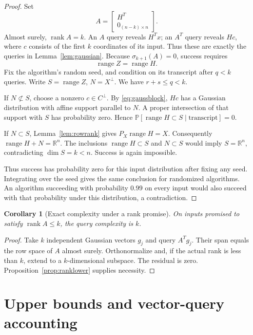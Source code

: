 \documentclass[11pt]{article}
\numberwithin{equation}{section}
\newtheorem{corollary}[theorem]{Corollary}
\theoremstyle{definition}
\newcommand{\R}{\mathbb R}
\newcommand{\Prb}{\mathbb P}
\newcommand{\rank}{\operatorname{rank}}
\newcommand{\range}{\operatorname{range}}
\begin{document}
\begin{proof}
Set
\begin{equation}
 A=\begin{bmatrix}H^T\\0_{(n-k)\times n}\end{bmatrix}.
 \label{eq:rankfamily}
\end{equation}
Almost surely, $\rank A=k$. An $A$ query reveals $H^Tx$; an $A^T$ query
reveals $Hc$, where $c$ consists of the first $k$ coordinates of its input.
Thus these are exactly the queries in Lemma~\ref{lem:gaussian}.
Because $\sigma_{k+1}(A)=0$, success requires
\[
 \range Z=\range H.
\]
Fix the algorithm's random seed, and condition on its transcript after
$q<k$ queries. Write $S=\range Z$, $N=X^\perp$. We have $r+s\le q<k$.

If $N\not\subset S$, choose a nonzero $c\in C^\perp$. By
\eqref{eq:gaussblock}, $Hc$ has a Gaussian distribution with affine support
parallel to $N$. A proper intersection of that support with $S$ has
probability zero. Hence $\Prb[\range H\subset S\mid\text{transcript}]=0$.

If $N\subset S$, Lemma~\ref{lem:rowrank} gives
$P_X\range H=X$. Consequently $\range H+N=\R^n$.
The inclusions $\range H\subset S$ and $N\subset S$ would imply
$S=\R^n$, contradicting $\dim S=k<n$. Success is again impossible.

Thus success has probability zero for this input distribution after fixing
any seed. Integrating over the seed gives the same conclusion for randomized
algorithms. An algorithm succeeding with probability $0.99$ on every input
would also succeed with that probability under this distribution, a
contradiction.
\end{proof}

\begin{corollary}[Exact complexity under a rank promise]
\label{cor:promise}
On inputs promised to satisfy $\rank A\le k$, the query complexity is $k$.
\end{corollary}
\begin{proof}
Take $k$ independent Gaussian vectors $g_j$ and query $A^Tg_j$.
Their span equals the row space of $A$ almost surely. Orthonormalize and,
if the actual rank is less than $k$, extend to a $k$-dimensional subspace.
The residual is zero. Proposition~\ref{prop:ranklower} supplies necessity.
\end{proof}

\section{Upper bounds and vector-query accounting}
\label{sec:upper}
\end{document}
